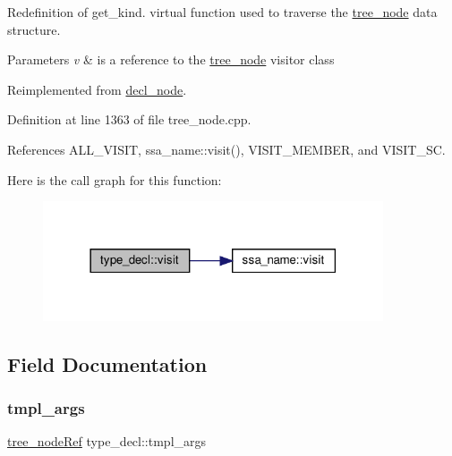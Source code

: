 Redefinition of get\+\_\+kind. virtual function used to traverse the \hyperlink{classtree__node}{tree\+\_\+node} data structure. 
\begin{DoxyParams}{Parameters}
{\em v} & is a reference to the \hyperlink{classtree__node}{tree\+\_\+node} visitor class \\
\hline
\end{DoxyParams}


Reimplemented from \hyperlink{structdecl__node_a9e63331f0c35d9af9d1997afafe9152a}{decl\+\_\+node}.



Definition at line 1363 of file tree\+\_\+node.\+cpp.



References A\+L\+L\+\_\+\+V\+I\+S\+IT, ssa\+\_\+name\+::visit(), V\+I\+S\+I\+T\+\_\+\+M\+E\+M\+B\+ER, and V\+I\+S\+I\+T\+\_\+\+SC.

Here is the call graph for this function\+:
\nopagebreak
\begin{figure}[H]
\begin{center}
\leavevmode
\includegraphics[width=285pt]{dd/dfd/structtype__decl_a6c09e2072a083c2625e79de59006f7e6_cgraph}
\end{center}
\end{figure}


\subsection{Field Documentation}
\mbox{\label{structtype__decl_ac5424f901331baa665c47f545adf08e6}} 
\subsubsection{\texorpdfstring{tmpl\+\_\+args}{tmpl\_args}}
{\footnotesize\ttfamily \hyperlink{tree__node_8hpp_a6ee377554d1c4871ad66a337eaa67fd5}{tree\+\_\+node\+Ref} type\+\_\+decl\+::tmpl\+\_\+args}



